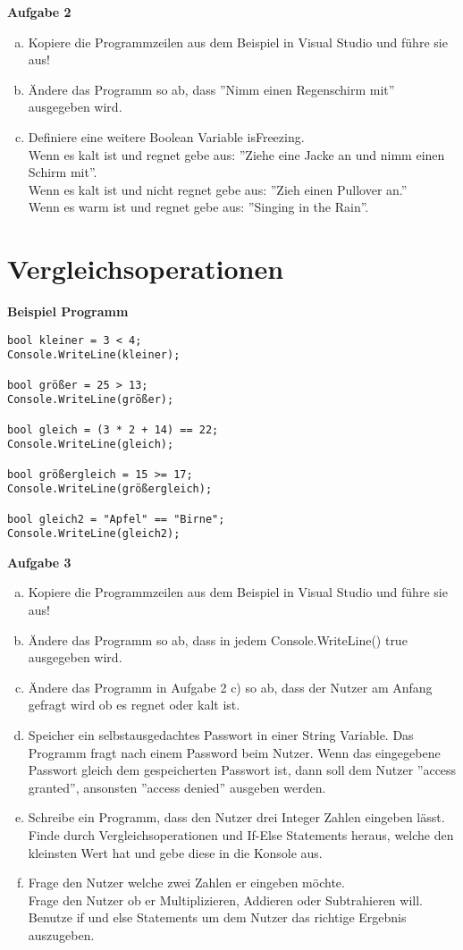 \documentclass[a4paper,12pt]{article}
\newcommand{\Aufgabe}[1]{
  {
  \vspace*{0.5cm}
  \textsf{\textbf{Aufgabe #1}}
  \vspace*{0.2cm}
  
  }
}
\newcommand{\Definition}[1]{
  {
  \vspace*{0.5cm}
  \textsf{\textbf{#1}}
  \vspace*{0.2cm}
  
  }
}
\begin{document}
\Aufgabe{2} 
\begin{enumerate}[a)]
\item
Kopiere die Programmzeilen aus dem Beispiel in Visual Studio und führe sie aus!
\item 
Ändere das Programm so ab, dass ''Nimm einen Regenschirm mit''  ausgegeben wird.
\item
Definiere eine weitere Boolean Variable isFreezing. \\
Wenn es kalt ist und regnet gebe aus: ''Ziehe eine Jacke an und nimm einen Schirm mit''. \\
Wenn es kalt ist und  nicht regnet gebe aus: ''Zieh einen Pullover an.'' \\
Wenn es warm ist und regnet gebe aus: ''Singing in the Rain''. 
\end{enumerate}

\section{Vergleichsoperationen}
\Definition{Beispiel Programm}

\begin{verbatim}
bool kleiner = 3 < 4;
Console.WriteLine(kleiner);

bool größer = 25 > 13;
Console.WriteLine(größer);

bool gleich = (3 * 2 + 14) == 22;
Console.WriteLine(gleich);

bool größergleich = 15 >= 17;
Console.WriteLine(größergleich);

bool gleich2 = "Apfel" == "Birne";
Console.WriteLine(gleich2);
\end{verbatim}

\Aufgabe{3} 
\begin{enumerate}[a)]
\item
Kopiere die Programmzeilen aus dem Beispiel in Visual Studio und führe sie aus!
\item 
Ändere das Programm so ab, dass in jedem Console.WriteLine() true ausgegeben wird.
\item
Ändere das Programm in Aufgabe 2 c) so ab, dass der Nutzer am Anfang gefragt wird ob es regnet oder kalt ist.
\item
Speicher ein selbstausgedachtes Passwort in einer String Variable.
Das Programm fragt nach einem Password beim Nutzer.
Wenn das eingegebene Passwort gleich dem gespeicherten Passwort ist, dann soll dem Nutzer ''access granted'', ansonsten ''access denied'' ausgeben werden.
\item 
Schreibe ein Programm, dass den Nutzer drei Integer Zahlen eingeben lässt. Finde durch Vergleichsoperationen und If-Else Statements heraus, welche den kleinsten Wert hat und gebe diese in die Konsole aus.
\item
Frage den Nutzer welche zwei Zahlen er eingeben möchte. \\
Frage den Nutzer ob er Multiplizieren, Addieren oder Subtrahieren will. \\
Benutze if und else Statements um dem Nutzer das richtige Ergebnis auszugeben. \\

\end{enumerate}
\end{document}
